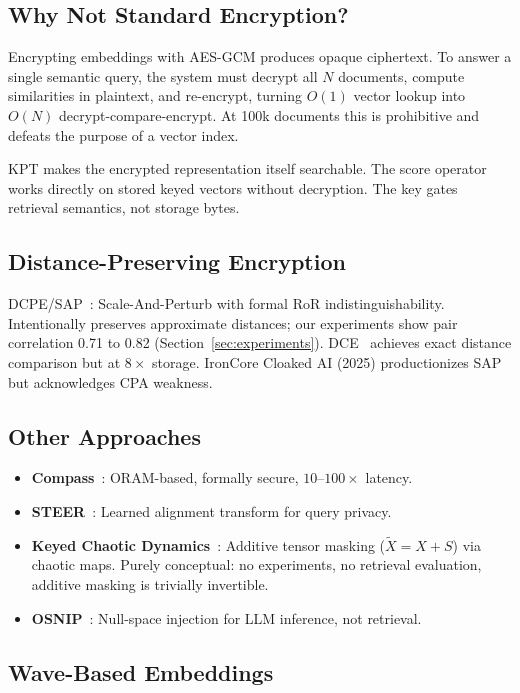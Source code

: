 \documentclass{article}
\begin{document}
\subsection{Why Not Standard Encryption?}

Encrypting embeddings with AES-GCM produces opaque ciphertext.
To answer a single semantic query, the system must decrypt all $N$ documents, compute similarities in plaintext, and re-encrypt, turning $O(1)$ vector lookup into $O(N)$ decrypt-compare-encrypt.
At 100k documents this is prohibitive and defeats the purpose of a vector index.

KPT makes the encrypted representation itself searchable.
The score operator works directly on stored keyed vectors without decryption.
The key gates retrieval semantics, not storage bytes.

\subsection{Distance-Preserving Encryption}

DCPE/SAP~\citep{fuchsbauer2022}: Scale-And-Perturb with formal RoR indistinguishability.
Intentionally preserves approximate distances; our experiments show pair correlation 0.71 to 0.82 (Section~\ref{sec:experiments}).
DCE~\citep{liu2025} achieves exact distance comparison but at $8\times$ storage.
IronCore Cloaked AI (2025) productionizes SAP but acknowledges CPA weakness.

\subsection{Other Approaches}

\begin{itemize}[nosep]
  \item \textbf{Compass}~\citep{zhu2024}: ORAM-based, formally secure, $10$--$100\times$ latency.
  \item \textbf{STEER}~\citep{he2025}: Learned alignment transform for query privacy.
  \item \textbf{Keyed Chaotic Dynamics}~\citep{fagan2025}: Additive tensor masking ($\tilde{X}=X+S$) via chaotic maps. Purely conceptual: no experiments, no retrieval evaluation, additive masking is trivially invertible.
  \item \textbf{OSNIP}~\citep{cao2026}: Null-space injection for LLM inference, not retrieval.
\end{itemize}

\subsection{Wave-Based Embeddings}
\end{document}
